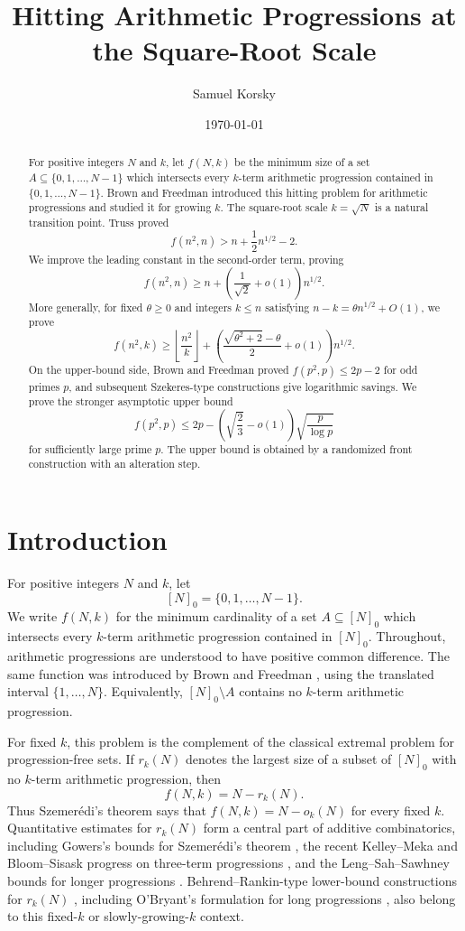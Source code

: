 \documentclass[11pt]{article}
\title{Hitting Arithmetic Progressions at the Square-Root Scale}
\author{Samuel Korsky}
\date{\today}
\theoremstyle{remark}
\newcommand{\floor}[1]{\left\lfloor #1\right\rfloor}
\numberwithin{equation}{section}
\begin{document}
\maketitle

\begin{abstract}
\noindent
For positive integers $N$ and $k$, let $f(N,k)$ be the minimum size of a set $A\subseteq\{0,1,\ldots,N-1\}$ which intersects every $k$-term arithmetic progression contained in $\{0,1,\ldots,N-1\}$.
Brown and Freedman introduced this hitting problem for arithmetic progressions and studied it for growing $k$.
The square-root scale $k=\sqrt N$ is a natural transition point.
Truss proved
\[
        f(n^2,n)>n+\frac12 n^{1/2}-2.
\]
We improve the leading constant in the second-order term, proving
\[
        f(n^2,n)\ge n+\left(\frac1{\sqrt2}+o(1)\right)n^{1/2}.
\]
More generally, for fixed $\theta\ge0$ and integers $k\le n$ satisfying $n-k=\theta n^{1/2}+O(1)$, we prove
\[
        f(n^2,k)
        \ge
        \floor{\frac{n^2}{k}}
        +
        \left(\frac{\sqrt{\theta^2+2}-\theta}{2}+o(1)\right)n^{1/2}.
\]
On the upper-bound side, Brown and Freedman proved $f(p^2,p)\le 2p-2$ for odd primes $p$, and subsequent Szekeres-type constructions give logarithmic savings.
We prove the stronger asymptotic upper bound
\[
        f(p^2,p)
        \le
        2p-\left(\sqrt{\frac23}-o(1)\right)\sqrt{\frac p{\log p}}
\]
for sufficiently large prime $p$.
The upper bound is obtained by a randomized front construction with an alteration step.
\end{abstract}

\section{Introduction}

For positive integers $N$ and $k$, let
\[
        [N]_0=\{0,1,\ldots,N-1\}.
\]
We write $f(N,k)$ for the minimum cardinality of a set $A\subseteq[N]_0$ which intersects every $k$-term arithmetic progression contained in $[N]_0$.
Throughout, arithmetic progressions are understood to have positive common difference.
The same function was introduced by Brown and Freedman \cite{BrownFreedman}, using the translated interval $\{1,\ldots,N\}$.
Equivalently, $[N]_0\setminus A$ contains no $k$-term arithmetic progression.

For fixed $k$, this problem is the complement of the classical extremal problem for progression-free sets.
If $r_k(N)$ denotes the largest size of a subset of $[N]_0$ with no $k$-term arithmetic progression, then
\[
        f(N,k)=N-r_k(N).
\]
Thus Szemer\'edi's theorem \cite{Szemeredi} says that $f(N,k)=N-o_k(N)$ for every fixed $k$.
Quantitative estimates for $r_k(N)$ form a central part of additive combinatorics, including Gowers's bounds for Szemer\'edi's theorem \cite{Gowers}, the recent Kelley--Meka and Bloom--Sisask progress on three-term progressions \cite{KelleyMeka,BloomSisask}, and the Leng--Sah--Sawhney bounds for longer progressions \cite{LengSahSawhney}.
Behrend--Rankin-type lower-bound constructions for $r_k(N)$ \cite{Behrend,Rankin}, including O'Bryant's formulation for long progressions \cite{OBryant}, also belong to this fixed-$k$ or slowly-growing-$k$ context.
\end{document}
